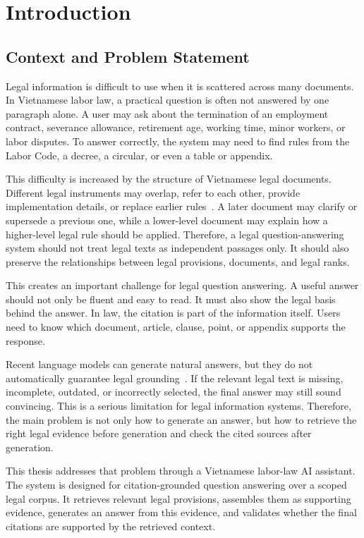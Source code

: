 \section{Introduction}

\subsection{Context and Problem Statement}
Legal information is difficult to use when it is scattered across many documents. In Vietnamese labor law, a practical question is often not answered by one paragraph alone. A user may ask about the termination of an employment contract, severance allowance, retirement age, working time, minor workers, or labor disputes. To answer correctly, the system may need to find rules from the Labor Code, a decree, a circular, or even a table or appendix.

This difficulty is increased by the structure of Vietnamese legal documents. Different legal instruments may overlap, refer to each other, provide implementation details, or replace earlier rules~\cite{vietnam2015law80,vietnam2020law63}. A later document may clarify or supersede a previous one, while a lower-level document may explain how a higher-level legal rule should be applied. Therefore, a legal question-answering system should not treat legal texts as independent passages only. It should also preserve the relationships between legal provisions, documents, and legal ranks.

This creates an important challenge for legal question answering. A useful answer should not only be fluent and easy to read. It must also show the legal basis behind the answer. In law, the citation is part of the information itself. Users need to know which document, article, clause, point, or appendix supports the response.

Recent language models can generate natural answers, but they do not automatically guarantee legal grounding~\cite{ji2023survey}. If the relevant legal text is missing, incomplete, outdated, or incorrectly selected, the final answer may still sound convincing. This is a serious limitation for legal information systems. Therefore, the main problem is not only how to generate an answer, but how to retrieve the right legal evidence before generation and check the cited sources after generation.

This thesis addresses that problem through a Vietnamese labor-law AI assistant. The system is designed for citation-grounded question answering over a scoped legal corpus. It retrieves relevant legal provisions, assembles them as supporting evidence, generates an answer from this evidence, and validates whether the final citations are supported by the retrieved context.

